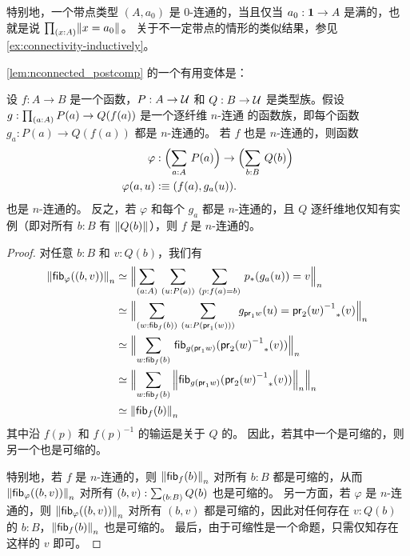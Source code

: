 特别地，一个带点类型 $(A,a_0)$ 是 0-连通的，当且仅当 $a_0:\unit\to A$ 是满的，也就是说 $\prd{x:A} \brck{x=a_0}$。
关于不一定带点的情形的类似结果，参见 \cref{ex:connectivity-inductively}。

\cref{lem:nconnected_postcomp} 的一个有用变体是：

\begin{lem}\label{lem:nconnected_postcomp_variation}
设 $f:A\to B$ 是一个函数，$P:A\to\type$ 和 $Q:B\to\type$ 是类型族。假设 $g:\prd{a:A} P(a)\to Q(f(a))$
是一个逐纤维 $n$-连通%
的函数族，即每个函数 $g_a : P(a) \to Q(f(a))$ 都是 $n$-连通的。
若 $f$ 也是 $n$-连通的，则函数
\begin{align*}
\varphi &:\Parens{\sm{a:A} P(a)}\to\Parens{\sm{b:B} Q(b)}\\
\varphi(a,u) &\defeq \pairr{f(a),g_a(u)}.
\end{align*}
也是 $n$-连通的。
反之，若 $\varphi$ 和每个 $g_a$ 都是 $n$-连通的，且 $Q$ 逐纤维地仅知有实例（即对所有 $b:B$ 有 $\brck{Q(b)}$），则 $f$ 是 $n$-连通的。
\end{lem}

\begin{proof}
对任意 $b:B$ 和 $v:Q(b)$，我们有
{\allowdisplaybreaks
\begin{align*}
\trunc n{\hfib{\varphi}{\pairr{b,v}}} & \eqvsym \Trunc n{\sm{a:A}{u:P(a)}{p:f(a)= b} \trans{p}{g_a(u)}= v}\\
& \eqvsym \Trunc n{\sm{w:\hfib{f}b}{u:P(\proj1(w))} g_{\proj 1 w}(u)= \trans{\opp{\proj2(w)}}{v}}\\
& \eqvsym \Trunc n{\sm{w:\hfib{f}b} \hfib{g(\proj1 w)}{\trans{\opp{\proj 2(w)}}{v}}}\\
& \eqvsym \Trunc n{\sm{w:\hfib{f}b} \trunc n{\hfib{g(\proj1 w)}{\trans{\opp{\proj 2(w)}}{v}}}}\\
& \eqvsym \trunc n{\hfib{f}b}
\end{align*}}%
其中沿 $f(p)$ 和 $f(p)^{-1}$ 的输运是关于 $Q$ 的。
因此，若其中一个是可缩的，则另一个也是可缩的。

特别地，若 $f$ 是 $n$-连通的，则 $\trunc n{\hfib{f}b}$ 对所有 $b:B$ 都是可缩的，从而 $\trunc n{\hfib{\varphi}{\pairr{b,v}}}$ 对所有 $(b,v):\sm{b:B} Q(b)$ 也是可缩的。
另一方面，若 $\varphi$ 是 $n$-连通的，则 $\trunc n{\hfib{\varphi}{\pairr{b,v}}}$ 对所有 $(b,v)$ 都是可缩的，因此对任何存在 $v:Q(b)$ 的 $b:B$，$\trunc n{\hfib{f}b}$ 也是可缩的。
最后，由于可缩性是一个命题，只需仅知存在这样的 $v$ 即可。
\end{proof}

